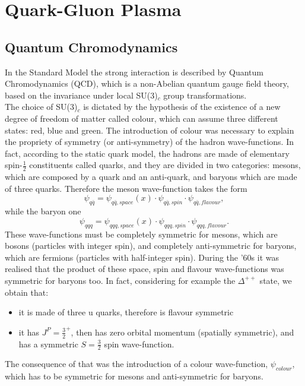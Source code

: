\documentclass[b5paper,10pt,twoside,oldstyle,classica]{toptesi}
\begin{document}
\tableofcontents

\listoffigures

\listoftables
\newpage
\thispagestyle{empty}
\cleardoublepage

\mainmatter
\chapter{Quark-Gluon Plasma}
\label{QGP-section}
\section{Quantum Chromodynamics}
In the Standard Model the strong interaction is described by Quantum Chromodynamics (QCD), which is a non-Abelian quantum gauge field theory, based on the invariance under local SU(3)$_{c}$ group transformations.\\
The choice of SU(3)$_c$ is dictated by the hypothesis of the existence of a new degree of freedom of matter called colour, which can assume three different states: red, blue and green. The introduction of colour was necessary to explain the propriety of symmetry (or anti-symmetry) of the hadron wave-functions. In fact, according to the static quark model, the hadrons are made of elementary spin-$\frac{1}{2}$ constituents called quarks, and they are divided in two categories: mesons, which are composed by a quark and an anti-quark, and baryons which are made of three quarks. Therefore the meson wave-function takes the form
\begin{equation}
\psi_{q\bar{q}} = \psi_{q\bar{q},space}(x)\cdot\psi_{q\bar{q},spin}\cdot\psi_{q\bar{q},flavour},
\end{equation}
while the baryon one
\begin{equation}
\psi_{qqq} = \psi_{qqq,space}(x)\cdot\psi_{qqq,spin}\cdot\psi_{qqq,flavour}.
\end{equation}
These wave-functions must be completely symmetric for mesons, which are bosons (particles with integer spin), and completely anti-symmetric for baryons, which are fermions (particles with half-integer spin).
During the '60s it was realised that the product of these space, spin and flavour wave-functions was symmetric for baryons too. In fact, considering for example the $\Delta^{++}$ state, we obtain that:
\begin{itemize}
 \item it is made of three u quarks, therefore is flavour symmetric
 \item it has $J^P = \frac{3}{2}^{+}$, then has zero orbital momentum (spatially symmetric), and has a symmetric $S = \frac{3}{2}$ spin wave-function. 
\end{itemize}
 The consequence of that was the introduction of a colour wave-function, $\psi_{colour}$, which has to be symmetric for mesons and anti-symmetric for baryons. 
\end{document}
